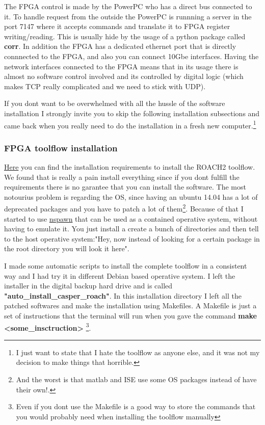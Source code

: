 The FPGA control is made by the PowerPC who has a direct bus connected to it. To handle request from the outside the PowerPC is runnning a server in the port 7147 where it accepts commands and translate it to FPGA register writing/reading. This is usually hide by the usage of a python package called \textbf{corr}. In addition the FPGA has a dedicated ethernet port that is directly connnected to the FPGA, and also you can connect 10Gbe interfaces. Having the network interfaces connected to the FPGA means that in its usage there is almost no software control involved and its controlled by digital logic (which makes TCP really complicated and we need to stick with UDP).




If you dont want to be overwhelmed with all the hussle of the software installation I strongly invite you to skip the following installation subsections and came back when you really need to do the installation in a fresh new computer.\footnote{I just want to state that I hate the toolflow as anyone else, and it was not my decision to make things that horrible.}

\subsubsection{FPGA toolflow installation}

\href{https://casper-toolflow.readthedocs.io/en/latest/src/Installing-the-Toolflow.html}{Here} you can find the installation requirements to install the ROACH2 toolflow. We found that is really a pain install everything since if you dont fulfill the requirements there is no garantee that you can install the software. The most notourius problem is regarding the OS, since having an ubuntu 14.04 has a lot of deprecated packages and you have to patch a lot of them\footnote{And the worst is that matlab and ISE use some OS packages instead of have their own!.}.
Because of that I started to use \href{https://wiki.archlinux.org/title/Systemd-nspawn}{nspawn} that can be used as a contained operative system, without having to emulate it. You just install a create a bunch of directories and then tell to the host operative system:"Hey, now instead of looking for a certain package in the root directory you will look it here".

I made some automatic scripts to install the complete toolflow in a consistent way and I had try it in different Debian based operative system. I left the installer in the digital backup hard drive and is called \textbf{"auto\_install\_casper\_roach"}. In this installation directory I left all the patched softwares and make the installation using Makefiles. A Makefile is just a set of instructions that the terminal will run when you gave the command \textbf{make <some\_insctruction>} \footnote{Even if you dont use the Makefile is a good way to store the commands that you would probably need when installing the toolflow manually}.


